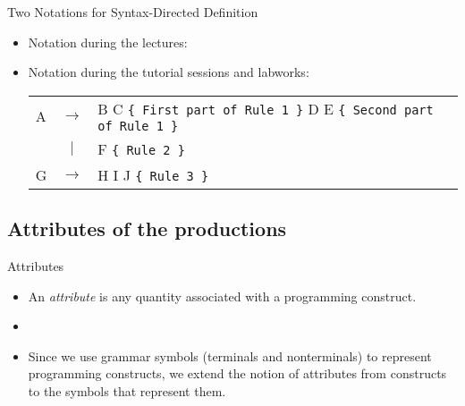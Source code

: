 \begin{bibunit}[apalike]
\begin{frame}{Two Notations for Syntax-Directed Definition}
	\begin{itemize}
	\item Notation during the lectures:
		\begin{sdd}
		\end{sdd}
	\vfill
	\item Notation during the tutorial sessions and labworks:
		\begin{tabularx}{\linewidth}{|lcX|}
		\hline
		{\bnfstyle A} & $\rightarrow$ & {\bnfstyle B C} \texttt{\{ First part of Rule 1 \}} {\bnfstyle D E} \texttt{\{ Second part of Rule 1 \}} \\
		& $|$ & {\bnfstyle F} \texttt{\{ Rule 2 \}} \\
		{\bnfstyle G} & $\rightarrow$ & {\bnfstyle H I J} \texttt{\{ Rule 3 \}} \\
		\hline
		\end{tabularx}
	\end{itemize}
\end{frame}

\subsection{Attributes of the productions}

\tableofcontentslide[sections={1-4},sectionstyle={show/shaded},subsectionstyle={show/shaded/hide},subsubsectionstyle={show/show/hide/hide}]

\begin{frame}{Attributes}
	\begin{itemize}
	\item An \emph{attribute} is any quantity associated with a programming construct.
	\vfill
	\item {}
	\vfill
	\item Since we use grammar symbols (terminals and nonterminals) to represent programming constructs, we extend the notion of attributes from constructs to the symbols that represent them.
	\end{itemize}
\end{frame}


\end{bibunit}
